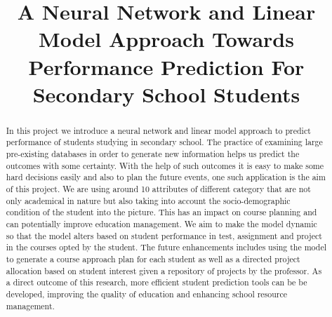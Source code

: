 \documentclass[conference]{IEEEtran}
\begin{document}
	\title{A Neural Network and Linear Model Approach Towards Performance Prediction For Secondary School Students}
    	\author{
		}

	\maketitle
	\begin{abstract}
In this project we introduce a neural network and linear model approach to predict performance of students studying in secondary school. The practice of examining large pre-existing databases in order to generate new information helps us predict the outcomes with some certainty. With the help of such outcomes it is easy to make some hard decisions easily and also to plan the future events, one such application is the aim of this project. We are using around 10 attributes of different category that are not only academical in nature but also taking into account the socio-demographic condition of the student into the picture. 
This has an impact on course planning and can potentially improve education management. We aim to make the model dynamic so that the model alters based on student performance in test, assignment and project in the courses opted by the student. The future enhancements includes using the model to generate a course approach plan for each student as well as a directed project allocation based on student interest given a repository of projects by the professor. As a direct outcome of this research, more efficient student prediction tools can be be developed, improving the quality of education and enhancing school resource management.

	\end{abstract}
\end{document}
